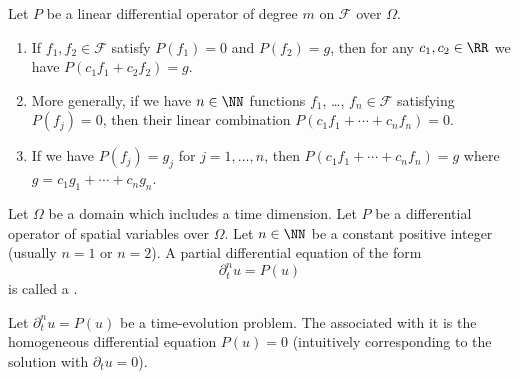 \begin{node}
\begin{theorem}\label{pde-000J}%
Let $P$ be a linear differential operator of degree $m$ on $\mathcal{F}$
over $\Omega$.
\begin{enumerate}
\item If $f_{1},f_{2}\in\mathcal{F}$ satisfy $P(f_{1})=0$ and
$P(f_{2})=g$, then for any $c_{1},c_{2}\in\RR$ we have
$P(c_{1}f_{1}+c_{2}f_{2})=g$.
\item More generally, if we have $n\in\NN$
functions $f_{1}$, \dots, $f_{n}\in\mathcal{F}$ satisfying $P(f_{j})=0$,
then their linear combination $P(c_{1}f_{1}+\cdots+c_{n}f_{n})=0$.
\item If we have $P(f_{j})=g_{j}$ for $j=1,\dots,n$, then
$P(c_{1}f_{1}+\cdots+c_{n}f_{n})=g$ where $g=c_{1}g_{1}+\cdots+c_{n}g_{n}$.
\end{enumerate}
\end{theorem}
\end{node}

\begin{node}\label{pde-000M}%
\begin{definition}\label{pde-000N}%
Let $\Omega$ be a domain which includes a time dimension.
Let $P$ be a differential operator of spatial variables over $\Omega$.
Let $n\in\NN$ be a constant positive integer (usually $n=1$ or $n=2$).
A partial differential equation of the form
\begin{equation*}
\partial_{t}^{n}u=P(u)
\end{equation*}
is called a .
\end{definition}

\begin{definition}\label{pde-000O}%
Let $\partial_{t}^{n}u=P(u)$ be a time-evolution problem. The
 associated with it is the homogeneous
differential equation $P(u)=0$ (intuitively corresponding to the
solution with $\partial_{t}u=0$).
\end{definition}
\end{node}

